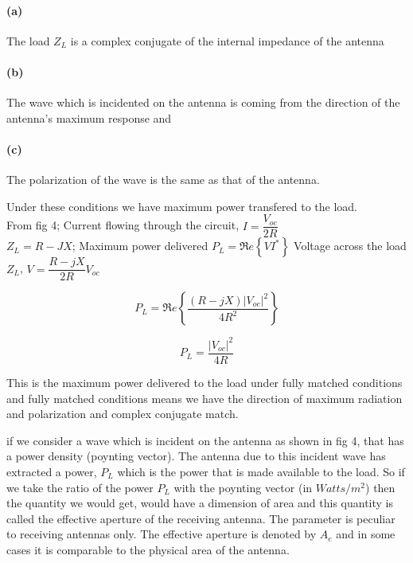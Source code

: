 \paragraph*{(a)} The load $Z_{L}$ is a complex conjugate of the internal impedance of the antenna

\paragraph*{(b)} The wave which is incidented on the antenna is coming from the direction of the antenna's maximum response and

\paragraph*{(c)} The polarization of the wave is the same as that of the antenna.\newline

Under these conditions we have maximum power transfered to the load.\\
From fig 4; Current flowing through the circuit, $I=\dfrac{V_{oc}}{2R}$ \\
$Z_{L}=R-JX$; Maximum power delivered $P_{L}=\Re e\left\{VI^{*}\right\}$
\newline Voltage across the load $Z_{L}$, $V={\dfrac{R-jX}{2R}}V_{oc}$ 


$$P_{L}=\Re e\left\{\dfrac{(R-jX)|V_{oc}|^{2}}{4R^{2}}\right\}$$




$$P_{L}=\dfrac{|V_{oc}|^{2}}{4R}$$



This is the maximum power delivered to the load under fully matched conditions and fully matched conditions means we have the direction of maximum radiation and polarization and complex conjugate match.


{if} we consider a wave which is incident on the antenna as shown in fig 4, that has a power density (poynting vector). The antenna due to this incident wave has extracted a power, $P_{L}$ which is the power that is made available to the load. So if we take the ratio of the power $P_{L}$ with the poynting vector (in $Watts/m^{2}$) then the quantity we would get, would have a dimension of area and this quantity is called the effective aperture of the receiving antenna. The parameter is peculiar to receiving antennas only. The effective aperture is denoted by $A_{e}$ and in some cases it is comparable to the physical area of the antenna.
\newline

